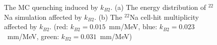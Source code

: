 \begin{figure}[h!]
\centering
{}\quad
{}
\caption[Quenched energy affected by different $k_{B2}$ values]{The MC quenching induced by $k_{B2}$. (a) The energy distribution of $^{22}$Na simulation affected by $k_{B2}$. (b) The $^{22}$Na cell-hit multiplicity affected by $k_{B2}$.  (red: $k_{B2} = 0.015$~mm/MeV, blue: $k_{B2} = 0.023$~mm/MeV, green: $k_{B2} = 0.031$~mm/MeV)}
\label{fig:kb2plot}
\end{figure}

